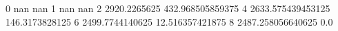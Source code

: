 0 nan nan
1 nan nan
2 2920.2265625 432.968505859375
4 2633.575439453125 146.3173828125
6 2499.7744140625 12.516357421875
8 2487.258056640625 0.0
